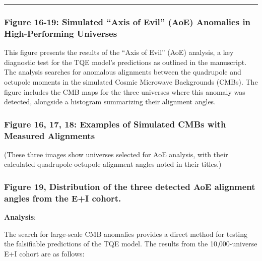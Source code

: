 \begin{center}\rule{0.5\linewidth}{0.5pt}\end{center}

\subsubsection{Figure 16-19: Simulated ``Axis of Evil'' (AoE) Anomalies
in High-Performing
Universes}\label{figure-16-19-simulated-axis-of-evil-aoe-anomalies-in-high-performing-universes}

This figure presents the results of the ``Axis of Evil'' (AoE) analysis,
a key diagnostic test for the TQE model's predictions as outlined in the
manuscript. The analysis searches for anomalous alignments between the
quadrupole and octupole moments in the simulated Cosmic Microwave
Backgrounds (CMBs). The figure includes the CMB maps for the three
universes where this anomaly was detected, alongside a histogram
summarizing their alignment angles.

\subsubsection{Figure 16, 17, 18: Examples of Simulated CMBs with
Measured
Alignments}\label{figure-16-17-18-examples-of-simulated-cmbs-with-measured-alignments}

(These three images show universes selected for AoE analysis, with their
calculated quadrupole-octupole alignment angles noted in their titles.)

\subsubsection{Figure 19, Distribution of the three detected AoE
alignment angles from the E+I
cohort.}\label{figure-19-distribution-of-the-three-detected-aoe-alignment-angles-from-the-ei-cohort.}

\textbf{Analysis}:

The search for large-scale CMB anomalies provides a direct method for
testing the falsifiable predictions of the TQE model. The results from
the 10,000-universe E+I cohort are as follows:

